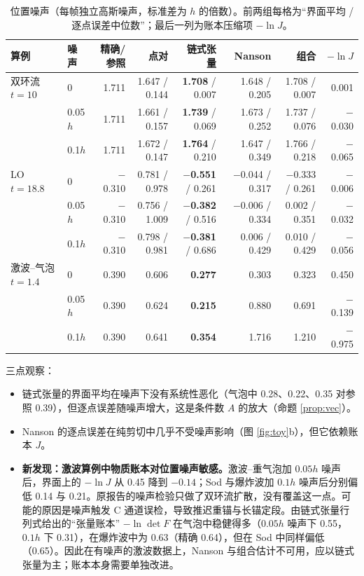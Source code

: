 \documentclass[10.5pt,a4paper]{article}
\theoremstyle{plain}
\begin{document}
\begin{table}[H]\centering\small
\caption{位置噪声（每帧独立高斯噪声，标准差为 $h$ 的倍数）。前两组每格为“界面平均 / 逐点误差中位数”；最后一列为账本压缩项 $-\ln J$。}\label{tab:noise}
\setlength{\tabcolsep}{3.5pt}\footnotesize
\begin{tabular}{llrrrrrr}\toprule
算例 & 噪声 & 精确/参照 & 点对 & \textbf{链式张量} & Nanson & 组合 & $-\ln J$ \\\midrule
双环流 $t=10$ & 0 & 1.711 & 1.647 / 0.144 & \textbf{1.708} / 0.007 & 1.648 / 0.205 & 1.708 / 0.007 & 0.001 \\
 & 0.05$h$ & 1.711 & 1.661 / 0.157 & \textbf{1.739} / 0.069 & 1.673 / 0.252 & 1.737 / 0.076 & $-$0.030 \\
 & 0.1$h$ & 1.711 & 1.672 / 0.147 & \textbf{1.764} / 0.210 & 1.647 / 0.349 & 1.766 / 0.218 & $-$0.065 \\
LO $t=18.8$ & 0 & $-$0.310 & 0.781 / 0.978 & \textbf{$-$0.551} / 0.261 & $-$0.044 / 0.317 & $-$0.333 / 0.261 & $-$0.006 \\
 & 0.05$h$ & $-$0.310 & 0.756 / 1.009 & \textbf{$-$0.382} / 0.516 & $-$0.006 / 0.334 & 0.002 / 0.351 & $-$0.032 \\
 & 0.1$h$ & $-$0.310 & 0.798 / 0.981 & \textbf{$-$0.381} / 0.686 & 0.006 / 0.429 & 0.010 / 0.429 & $-$0.056 \\
激波–气泡 $t=1.4$ & 0 & 0.390 & 0.606 & \textbf{0.277} & 0.303 & 0.323 & 0.450 \\
 & 0.05$h$ & 0.390 & 0.624 & \textbf{0.215} & 0.880 & 0.691 & $-$0.139 \\
 & 0.1$h$ & 0.390 & 0.641 & \textbf{0.354} & 1.716 & 1.210 & $-$0.975 \\\bottomrule
\end{tabular}
\end{table}

三点观察：
\begin{itemize}
\item 链式张量的界面平均在噪声下没有系统性恶化（气泡中 0.28、0.22、0.35 对参照 0.39），但逐点误差随噪声增大，这是条件数 $A$ 的放大（命题 \ref{prop:vec}）。
\item Nanson 的逐点误差在纯剪切中几乎不受噪声影响（图 \ref{fig:toy}b），但它依赖账本 $J$。
\item \textbf{新发现：激波算例中物质账本对位置噪声敏感。}激波–重气泡加 $0.05h$ 噪声后，界面上的 $-\ln J$ 从 0.45 降到 $-0.14$；Sod 与爆炸波加 $0.1h$ 噪声后分别偏低 0.14 与 0.21。原报告的噪声检验只做了双环流扩散，没有覆盖这一点。可能的原因是噪声触发 C 通道误检，导致推迟重锚与长锚定段。由链式张量行列式给出的“张量账本” $-\ln\det F$ 在气泡中稳健得多（$0.05h$ 噪声下 0.55，$0.1h$ 下 0.31），在爆炸波中为 0.63（精确 0.64），但在 Sod 中同样偏低（0.65）。因此在有噪声的激波数据上，Nanson 与组合估计不可用，应以链式张量为主；账本本身需要单独改进。
\end{itemize}
\end{document}
